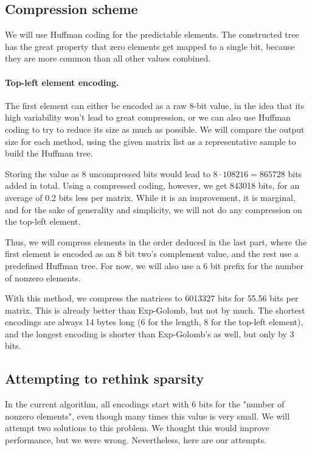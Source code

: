 \documentclass[11pt]{llncs}
\begin{document}
\subsection{Compression scheme}

We will use Huffman coding for the predictable elements. The constructed tree has the great property that zero elements get mapped to a single bit, because they are more common than all other values combined.

\paragraph{Top-left element encoding.} The first element can either be encoded as a raw 8-bit value, in the idea that its high variability won't lead to great compression, or we can also use Huffman coding to try to reduce its size as much as possible. We will compare the output size for each method, using the given matrix list as a representative sample to build the Huffman tree.

Storing the value as 8 uncompressed bits would lead to $8 \cdot 108216 = 865728$ bits added in total. Using a compressed coding, however, we get 843018 bits, for an average of 0.2 bits less per matrix. While it is an improvement, it is marginal, and for the sake of generality and simplicity, we will not do any compression on the top-left element.

Thus, we will compress elements in the order deduced in the last part, where the first element is encoded as an 8 bit two's complement value, and the rest use a predefined Huffman tree. For now, we will also use a 6 bit prefix for the number of nonzero elements.

With this method, we compress the matrices to 6013327 bits for 55.56 bits per matrix. This is already better than Exp-Golomb, but not by much. The shortest encodings are always 14 bytes long (6 for the length, 8 for the top-left element), and the longest encoding is shorter than Exp-Golomb's as well, but only by 3 bits.

\subsection{Attempting to rethink sparsity}

In the current algorithm, all encodings start with 6 bits for the "number of nonzero elements", even though many times this value is very small. We will attempt two solutions to this problem. We thought this would improve performance, but we were wrong. Nevertheless, here are our attempts.
\end{document}
